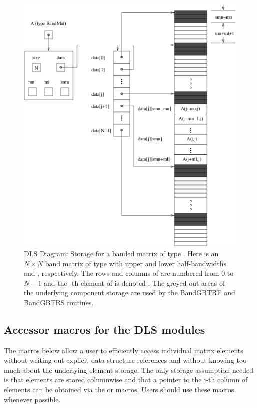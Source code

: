 \documentclass[letterpaper,10pt,english]{sphinxmanual}
\begin{document}
\begin{figure}[htbp]
\centering
\capstart

\includegraphics{bandmat.png}
\caption{DLS Diagram: Storage for a banded matrix of type {\hyperref[linear_solvers/DLS:DlsMat]{}}. Here
 is an $N \times N$ band matrix of type {\hyperref[linear_solvers/DLS:DlsMat]{}}
with upper and lower half-bandwidths  and ,
respectively. The rows and columns of  are numbered from
$0$ to $N-1$ and the -th element of  is
denoted . The greyed out areas of the underlying
component storage are used by the BandGBTRF and BandGBTRS routines.}\label{linear_solvers/DLS:dls-figure}\end{figure}


\subsection{Accessor macros for the DLS modules}
\label{linear_solvers/DLS:accessor-macros-for-the-dls-modules}
The macros below allow a user to efficiently access individual matrix
elements without writing out explicit data structure references and
without knowing too much about the underlying element storage.  The
only storage assumption needed is that elements are stored columnwise
and that a pointer to the j-th column of elements can be obtained via
the {\hyperref[linear_solvers/DLS:DENSE_COL]{}} or {\hyperref[linear_solvers/DLS:BAND_COL]{}} macros. Users should use these
macros whenever possible.
\end{document}
